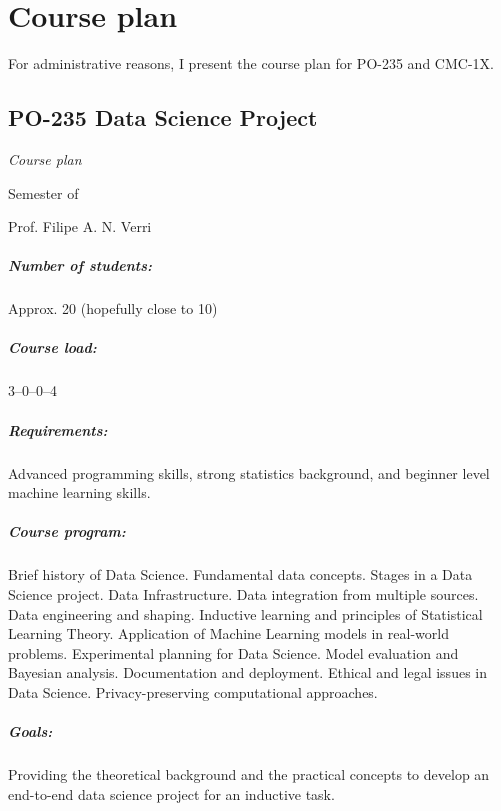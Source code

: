 \chapter*{Course plan}

For administrative reasons, I present the course plan for PO-235 and CMC-1X.

\newpage
{}
\thispagestyle{empty}
\section*{PO-235 Data Science Project}

\emph{Course plan}

 Semester of \the\year{}

Prof. Filipe A. N. Verri

\paragraph{Number of students:} Approx. 20 (hopefully close to 10)

\paragraph{Course load:} 3--0--0--4

\paragraph{Requirements:} Advanced programming skills, strong statistics background, and
beginner level machine learning skills.

\paragraph{Course program:}
Brief history of Data Science.  Fundamental data concepts. Stages in a Data Science
project.  Data Infrastructure. Data integration from multiple sources. Data engineering
and shaping.  Inductive learning and principles of Statistical Learning Theory.
Application of Machine Learning models in real-world problems.  Experimental planning for
Data Science. Model evaluation and Bayesian analysis.  Documentation and deployment.
Ethical and legal issues in Data Science.  Privacy-preserving computational approaches.

\paragraph{Goals:}
Providing the theoretical background and the practical concepts to develop an end-to-end
data science project for an inductive task.

